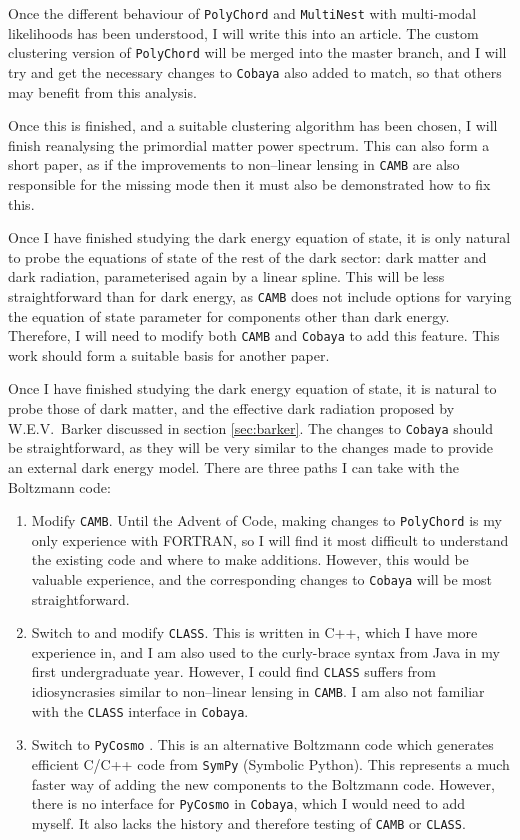 \documentclass{article}
\begin{document}
Once the different behaviour of \texttt{PolyChord} and \texttt{MultiNest} with multi-modal likelihoods has been understood, I will write this into an article. The custom clustering version of \texttt{PolyChord} will be merged into the master branch, and I will try and get the necessary changes to \texttt{Cobaya} also added to match, so that others may benefit from this analysis.

Once this is finished, and a suitable clustering algorithm has been chosen, I will finish reanalysing the primordial matter power spectrum. This can also form a short paper, as if the improvements to non--linear lensing in \texttt{CAMB} are also responsible for the missing mode then it must also be demonstrated how to fix this.

Once I have finished studying the dark energy equation of state, it is only natural to probe the equations of state of the rest of the dark sector: dark matter and dark radiation, parameterised again by a linear spline. This will be less straightforward than for dark energy, as \texttt{CAMB} does not include options for varying the equation of state parameter for components other than dark energy. Therefore, I will need to modify both \texttt{CAMB} and \texttt{Cobaya} to add this feature. This work should form a suitable basis for another paper.

Once I have finished studying the dark energy equation of state, it is natural to probe those of dark matter, and the effective dark radiation proposed by W.E.V.~Barker discussed in section \ref{sec:barker}. The changes to \texttt{Cobaya} should be straightforward, as they will be very similar to the changes made to provide an external dark energy model. There are three paths I can take with the Boltzmann code:
\begin{enumerate}
  \item Modify \texttt{CAMB}. Until the Advent of Code, making changes to \texttt{PolyChord} is my only experience with FORTRAN, so I will find it most difficult to understand the existing code and where to make additions. However, this would be valuable experience, and the corresponding changes to \texttt{Cobaya} will be most straightforward.
  \item Switch to and modify \texttt{CLASS}. This is written in C++, which I have more experience in, and I am also used to the curly-brace syntax from Java in my first undergraduate year. However, I could find \texttt{CLASS} suffers from idiosyncrasies similar to non--linear lensing in \texttt{CAMB}. I am also not familiar with the \texttt{CLASS} interface in \texttt{Cobaya}.
  \item Switch to \texttt{PyCosmo} \cite{pycosmo}. This is an alternative Boltzmann code which generates efficient C/C++ code from \texttt{SymPy} (Symbolic Python). This represents a much faster way of adding the new components to the Boltzmann code. However, there is no interface for \texttt{PyCosmo} in \texttt{Cobaya}, which I would need to add myself. It also lacks the history and therefore testing of \texttt{CAMB} or \texttt{CLASS}.
\end{enumerate}
\end{document}
